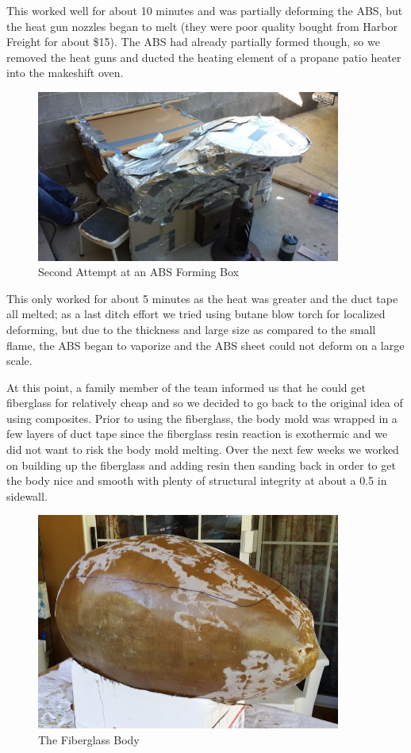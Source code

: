 \documentclass{report}
\begin{document}
This worked well for about 10 minutes and was partially deforming the ABS, but the heat gun nozzles began to melt (they were poor quality bought from Harbor Freight for about \$15).  The ABS had already partially formed though, so we removed the heat guns and ducted the heating element of a propane patio heater into the makeshift oven.
\begin{figure}[H]
\centering
\includegraphics[width=10cm]{hotbox2}
\caption{Second Attempt at an ABS Forming Box}
\end{figure}
This only worked for about 5 minutes as the heat was greater and the duct tape all melted; as a last ditch effort we tried using butane blow torch for localized deforming, but due to the thickness and large size as compared to the small flame, the ABS began to vaporize and the ABS sheet could not deform on a large scale.\par
At this point, a family member of the team informed us that he could get fiberglass for relatively cheap and so we decided to go back to the original idea of using composites.  Prior to using the fiberglass, the body mold was wrapped in a few layers of duct tape since the fiberglass resin reaction is exothermic and we did not want to risk the body mold melting.  Over the next few weeks we worked on building up the fiberglass and adding resin then sanding back in order to get the body nice and smooth with plenty of structural integrity at about a 0.5 in sidewall.
\begin{figure}[H]
\centering
\includegraphics[width=10cm]{finishedFglass}
\caption{The Fiberglass Body}
\end{figure}
\end{document}
